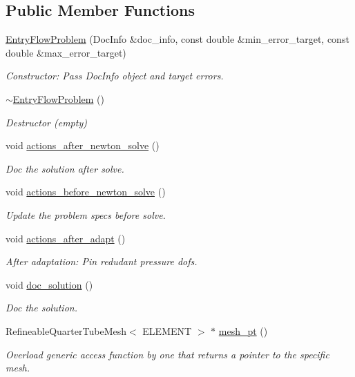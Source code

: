 \subsection*{Public Member Functions}
\begin{DoxyCompactItemize}
\item 
\hyperlink{classEntryFlowProblem_a0d527811321d270d769224dcbac8d240}{Entry\+Flow\+Problem} (Doc\+Info \&doc\+\_\+info, const double \&min\+\_\+error\+\_\+target, const double \&max\+\_\+error\+\_\+target)
\begin{DoxyCompactList}\small\item\em Constructor\+: Pass Doc\+Info object and target errors. \end{DoxyCompactList}\item 
\hyperlink{classEntryFlowProblem_a22d76abde64459f167067c1d2cb5c1e2}{$\sim$\+Entry\+Flow\+Problem} ()
\begin{DoxyCompactList}\small\item\em Destructor (empty) \end{DoxyCompactList}\item 
void \hyperlink{classEntryFlowProblem_a034e6085f31de2c44419090b64d503db}{actions\+\_\+after\+\_\+newton\+\_\+solve} ()
\begin{DoxyCompactList}\small\item\em Doc the solution after solve. \end{DoxyCompactList}\item 
void \hyperlink{classEntryFlowProblem_ae4dde95573350d8fdb19463849991130}{actions\+\_\+before\+\_\+newton\+\_\+solve} ()
\begin{DoxyCompactList}\small\item\em Update the problem specs before solve. \end{DoxyCompactList}\item 
void \hyperlink{classEntryFlowProblem_ae472a4319c372d33ee22dac8fb32d9a2}{actions\+\_\+after\+\_\+adapt} ()
\begin{DoxyCompactList}\small\item\em After adaptation\+: Pin redudant pressure dofs. \end{DoxyCompactList}\item 
void \hyperlink{classEntryFlowProblem_a8ba37cd2a4af4356e4182929027d7828}{doc\+\_\+solution} ()
\begin{DoxyCompactList}\small\item\em Doc the solution. \end{DoxyCompactList}\item 
Refineable\+Quarter\+Tube\+Mesh$<$ E\+L\+E\+M\+E\+NT $>$ $\ast$ \hyperlink{classEntryFlowProblem_a4a880eeef280b621728ecceea42fe3ff}{mesh\+\_\+pt} ()
\begin{DoxyCompactList}\small\item\em Overload generic access function by one that returns a pointer to the specific mesh. \end{DoxyCompactList}\end{DoxyCompactItemize}
